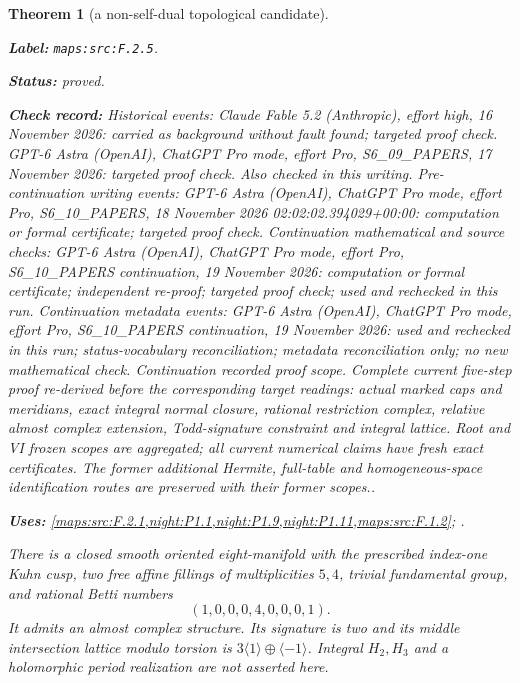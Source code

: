 \documentclass[11pt,a4paper]{article}
\newtheorem{theorem}{Theorem}[section]
\theoremstyle{definition}
\newcommand{\StatementRecord}[4]{\par\smallskip\begingroup\upshape\raggedright\noindent\textbf{Label:} \nolinkurl{#1}.\par\noindent\textbf{Status:} #2.\par\noindent\textbf{Check record:} #3.\par\noindent\textbf{Uses:} #4.\par\endgroup\smallskip}
\begin{document}
\begin{theorem}[a non-self-dual topological candidate]\label{maps:src:F.2.5}
\StatementRecord{maps:src:F.2.5}{proved}{Historical events: Claude Fable 5.2 (Anthropic), effort high, 16 November 2026: carried as background without fault found; targeted proof check. GPT-6 Astra (OpenAI), ChatGPT Pro mode, effort Pro, S6\_09\_PAPERS, 17 November 2026: targeted proof check. Also checked in this writing. Pre-continuation writing events: GPT-6 Astra (OpenAI), ChatGPT Pro mode, effort Pro, S6\_10\_PAPERS, 18 November 2026 02:02:02.394029+00:00: computation or formal certificate; targeted proof check. Continuation mathematical and source checks: GPT-6 Astra (OpenAI), ChatGPT Pro mode, effort Pro, S6\_10\_PAPERS continuation, 19 November 2026: computation or formal certificate; independent re-proof; targeted proof check; used and rechecked in this run. Continuation metadata events: GPT-6 Astra (OpenAI), ChatGPT Pro mode, effort Pro, S6\_10\_PAPERS continuation, 19 November 2026: used and rechecked in this run; status-vocabulary reconciliation; metadata reconciliation only; no new mathematical check. \emph{Continuation recorded proof scope.} Complete current five-step proof re-derived before the corresponding target readings: actual marked caps and meridians, exact integral normal closure, rational restriction complex, relative almost complex extension, Todd-signature constraint and integral lattice. Root and VI frozen scopes are aggregated; all current numerical claims have fresh exact certificates. The former additional Hermite, full-table and homogeneous-space identification routes are preserved with their former scopes.}{\cref{maps:src:F.2.1,night:P1.1,night:P1.9,night:P1.11,maps:src:F.1.2}; \cite{ffAchingerOgus20,StacksProject,HirzebruchTopologicalMethods,ffPetersSterk}}


There is a closed smooth oriented eight-manifold with the prescribed
index-one Kuhn cusp, two free affine fillings of multiplicities $5,4$,
trivial fundamental group, and rational Betti numbers
\[
 (1,0,0,0,4,0,0,0,1). \tag{F.5}\label{maps:eq:F.5}
\]
It admits an almost complex structure.  Its signature is two and
its middle intersection lattice modulo torsion is
$3\langle1\rangle\oplus\langle-1\rangle$.
Integral $H_2,H_3$ and a holomorphic period realization are not
asserted here.

\end{theorem}
\end{document}
